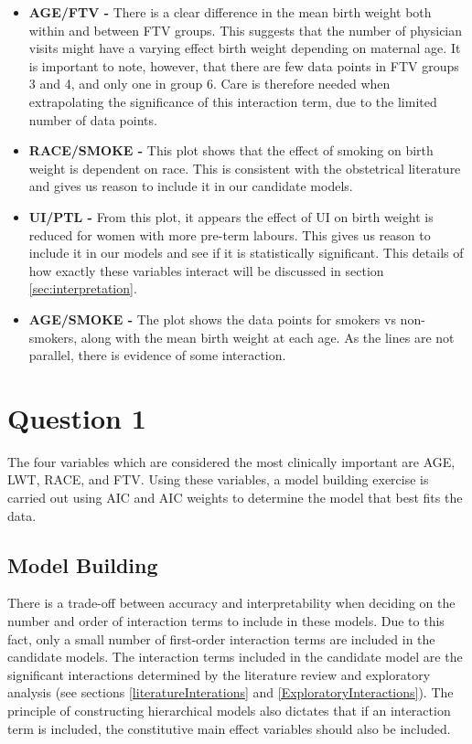\begin{itemize}
    \item \textbf{AGE/FTV -} There is a clear difference in the mean birth weight both within and between FTV groups. This suggests that the number of physician visits might have a varying effect birth weight depending on maternal age. It is important to note, however, that there are few data points in FTV groups 3 and 4, and only one in group 6. Care is therefore needed when extrapolating the significance of this interaction term, due to the limited number of data points.
    
    \item \textbf{RACE/SMOKE -} This plot shows that the effect of smoking on birth weight is dependent on race. This is consistent with the obstetrical literature and gives us reason to include it in our candidate models.
    
    \item \textbf{UI/PTL -} From this plot, it appears the effect of UI on birth weight is reduced for women with more pre-term labours. This gives us reason to include it in our models and see if it is statistically significant. This details of how exactly these variables interact will be discussed in section \ref{sec:interpretation}.
    
    \item \textbf{AGE/SMOKE -} The plot shows the data points for smokers vs non-smokers, along with the mean birth weight at each age. As the lines are not parallel, there is evidence of some interaction.
    
\end{itemize}

\section{Question 1}
The four variables which are considered the most clinically important are AGE, LWT, RACE, and FTV. Using these variables, a model building exercise is carried out using AIC and AIC weights to determine the model that best fits the data.

\subsection{Model Building} \label{BuildingOne}
There is a trade-off between accuracy and interpretability when deciding on the number and order of interaction terms to include in these models. Due to this fact, only a small number of first-order interaction terms are included in the candidate models. The interaction terms included in the candidate model are the significant interactions determined by the literature review and exploratory analysis (see sections \ref{literatureInterations} and \ref{ExploratoryInteractions}). The principle of constructing hierarchical models also dictates that if an interaction term is included, the constitutive main effect variables should also be included.

